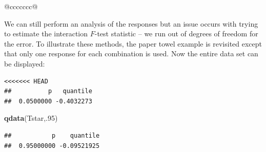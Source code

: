 \documentclass[]{book}
\newenvironment{Shaded}{\begin{snugshade}}{\end{snugshade}}
\newcommand{\KeywordTok}[1]{\textcolor[rgb]{0.13,0.29,0.53}{\textbf{#1}}}
\newcommand{\DecValTok}[1]{\textcolor[rgb]{0.00,0.00,0.81}{#1}}
\newcommand{\StringTok}[1]{\textcolor[rgb]{0.31,0.60,0.02}{#1}}
\newcommand{\OperatorTok}[1]{\textcolor[rgb]{0.81,0.36,0.00}{\textbf{#1}}}
\newcommand{\NormalTok}[1]{#1}
\theoremstyle{definition}
\theoremstyle{definition}
\theoremstyle{remark}
\begin{document}
\begin{longtable}[]{@{}ccccccc@{}}
\begin{minipage}[b]{0.10\columnwidth}
\begin{Shaded}
\begin{Highlighting}[]
\begin{Shaded}
\begin{Highlighting}[]
\begin{Shaded}
\begin{Highlighting}[]
\begin{Shaded}
\begin{Highlighting}[]
\begin{Shaded}
\begin{Highlighting}[]
\begin{Shaded}
\begin{Highlighting}[]
We can still perform an analysis of the responses but an issue occurs
with trying to estimate the interaction \(F\)-test statistic -- we run
out of degrees of freedom for the error. To illustrate these methods,
the paper towel example is revisited except that only one response for
each combination is used. Now the entire data set can be displayed:

\begin{Shaded}
\end{Shaded}

\begin{verbatim}
<<<<<<< HEAD
##          p   quantile 
##  0.0500000 -0.4032273
\end{verbatim}

\begin{Shaded}
\begin{Highlighting}[]
\KeywordTok{qdata}\NormalTok{(Tstar,.}\DecValTok{95}\NormalTok{)}
\end{Highlighting}
\end{Shaded}

\begin{verbatim}
##           p    quantile 
##  0.95000000 -0.09521925
\end{verbatim}

\begin{Shaded}
\end{Shaded}
\end{Highlighting}
\end{Shaded}
\end{Highlighting}
\end{Shaded}
\end{Highlighting}
\end{Shaded}
\end{Highlighting}
\end{Shaded}
\end{Highlighting}
\end{Shaded}
\end{Highlighting}
\end{Shaded}
\end{minipage}
\end{longtable}
\end{document}
